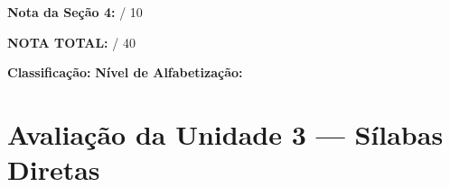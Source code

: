 \begin{avaliacao}
\medskip
\noindent\textbf{Nota da Seção 4:} \underline{\hspace{1cm}} / 10

\begin{center}
\large\textbf{NOTA TOTAL:} \underline{\hspace{1.5cm}} / 40
\end{center}

\begin{center}
\textbf{Classificação:} \underline{\hspace{3cm}}
\hspace{1cm}
\textbf{N\'{i}vel de Alfabetiza\c{c}\~{a}o:} \underline{\hspace{3cm}}
\end{center}

\end{avaliacao}


\section{Avaliação da Unidade 3 --- Sílabas Diretas}

